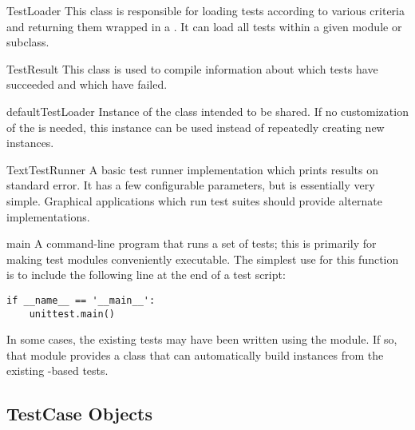 \begin{classdesc}{TestLoader}{}
  This class is responsible for loading tests according to various
  criteria and returning them wrapped in a .
  It can load all tests within a given module or 
  subclass.
\end{classdesc}

\begin{classdesc}{TestResult}{}
  This class is used to compile information about which tests have succeeded
  and which have failed.
\end{classdesc}

\begin{datadesc}{defaultTestLoader}
  Instance of the  class intended to be shared.  If no
  customization of the  is needed, this instance can
  be used instead of repeatedly creating new instances.
\end{datadesc}

\begin{classdesc}{TextTestRunner}{}
  A basic test runner implementation which prints results on standard
  error.  It has a few configurable parameters, but is essentially
  very simple.  Graphical applications which run test suites should
  provide alternate implementations.
\end{classdesc}

\begin{funcdesc}{main}{}
  A command-line program that runs a set of tests; this is primarily
  for making test modules conveniently executable.  The simplest use
  for this function is to include the following line at the end of a
  test script:

\begin{verbatim}
if __name__ == '__main__':
    unittest.main()
\end{verbatim}
\end{funcdesc}

In some cases, the existing tests may have been written using the
 module.  If so, that module provides a 
 class that can automatically build
 instances from the existing
-based tests.


\subsection{TestCase Objects
            \label{testcase-objects}}

